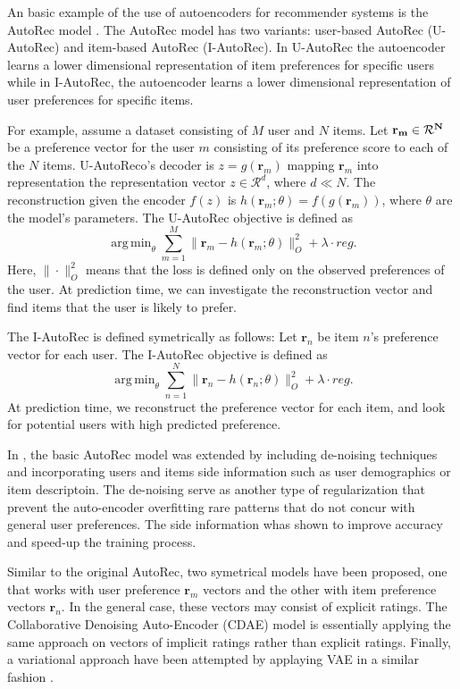 \documentclass[graybox]{svmult}
\DeclareMathOperator{\argmin}{arg\,min}
\newcommand{\mb}[1]{\mathbf{#1}}
\begin{document}
An basic example of the use of autoencoders for recommender systems is the AutoRec model \cite{AutoRec}. The AutoRec model has two variants: user-based AutoRec (U-AutoRec) and item-based AutoRec (I-AutoRec). In U-AutoRec the autoencoder learns  a lower dimensional representation of item preferences for specific users while in I-AutoRec, the autoencoder learns a lower dimensional representation of user preferences for specific items. 

For example, assume a dataset consisting of $M$ user and $N$ items. Let $\bf{r}_m \in \mathcal{R}^N$ be a preference vector for the user $m$ consisting of its preference score to each of the $N$ items. U-AutoReco's decoder is $z= g(\mb{r}_m)$ mapping $\mb{r}_m$ into representation the representation vector $z \in \mathcal{R}^{d}$, where $d \ll N$. The reconstruction given the encoder $f(z)$ is $h(\mb{r}_m; \theta)=f(g( \mb{r}_m ))$, where $\theta$ are the model's parameters. 
The U-AutoRec objective is defined as
\begin{equation}
    \argmin_{\theta} \sum_{m=1}^M \| \mb{r}_m -  h( \mb{r}_m; \theta)\|_{O}^2 + \lambda \cdot reg.
\end{equation}
Here, $\| \cdot \|_{O}^2$ means that the loss is defined only on the observed preferences of the user.
At prediction time, we can investigate the reconstruction vector and find items that the user is likely to prefer. 

The I-AutoRec is defined symetrically as follows: Let $\mb{r}_n$ be item $n$'s preference vector for each user.  The I-AutoRec objective is defined as
\begin{equation}
    \argmin_{\theta} \sum_{n=1}^N \| \mb{r}_n -  h( \mb{r}_n; \theta)\|_{O}^2 + \lambda \cdot reg.
\end{equation}
At prediction time, we reconstruct the preference vector for each item, and look for potential users with high predicted preference. 

In \cite{Hybrid_AutoRec1,Hybrid_AutoRec2}, the basic AutoRec model was extended by including de-noising techniques and incorporating users and items side information such as user demographics or item descriptoin. The de-noising serve as another type of regularization that prevent the auto-encoder overfitting rare patterns that do not concur with general user preferences. The side information whas shown to improve accuracy and speed-up the training process. 


Similar to the original AutoRec, two symetrical models have been proposed, one that works with user preference $\mb{r}_m$ vectors and the other with item preference vectors $\mb{r}_n$. In the general case, these vectors may consist of explicit ratings. The Collaborative Denoising Auto-Encoder (CDAE) model \cite{Hybrid_AutoRec_implicit} is essentially applying the same approach on vectors of implicit ratings rather than explicit ratings. Finally, a variational approach have been attempted by applaying VAE in a similar fashion \cite{RecSys_VAE}.  
\end{document}
